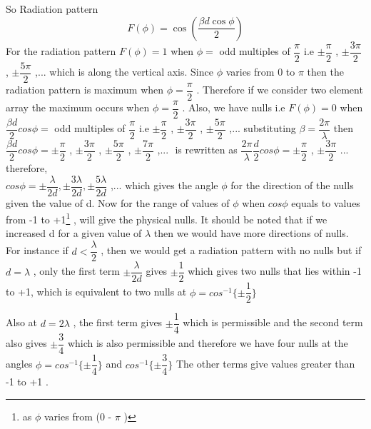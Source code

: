 So Radiation pattern
$$F(\phi) = \cos\left(\frac{\beta d\cos\phi}{2}\right)$$
For the radiation pattern $ F(\phi) = 1 $ when $\phi = $ odd multiples of $ \dfrac{\pi}{2} $ i.e $ \pm \dfrac{\pi}{2} $ , $ \pm \dfrac{3\pi}{2} $ , $ \pm \dfrac{5\pi}{2} $ ,... which is along the vertical axis. Since $ \phi $ varies from 0 to $ \pi $ then the radiation pattern is maximum when $ \phi = \dfrac{\pi}{2} $ . Therefore if we consider two element array the maximum occurs when $ \phi = \dfrac{\pi}{2} $ . Also, we have nulls i.e $ F(\phi) = 0 $ when $ \dfrac{\beta d}{2} cos\phi = $ odd multiples of $ \dfrac{\pi}{2} $  i.e  $ \pm \dfrac{\pi}{2} $ , $ \pm \dfrac{3\pi}{2} $ , $ \pm \dfrac{5\pi}{2} $ ,... substituting $ \beta = \dfrac{2\pi}{\lambda} $ then $ \dfrac{\beta d}{2} cos\phi = \pm \dfrac{\pi}{2} $ , $ \pm \dfrac{3\pi}{2} $ , $ \pm \dfrac{5\pi}{2} $ , $ \pm \dfrac{7\pi}{2} $ ,... $ $ is rewritten as $ \dfrac{2\pi}{\lambda} \dfrac{d}{2} cos \phi = \pm \dfrac{\pi}{2} $ , $ \pm \dfrac{3\pi}{2} $ ... therefore,
\\ $ cos \phi = \pm \dfrac{\lambda}{2d} , \pm \dfrac{3\lambda}{2d} , \pm \dfrac{5\lambda}{2d} $ ,... which gives the angle $ \phi $ for the direction of the nulls given the value of d. Now for the range of values of $ \phi $ when $ cos\phi $ equals to values from -1 to +1\footnote{as $ \phi $ varies from (0 - $ \pi $ )} , will give the physical nulls. It should be noted that if we increased d for a given value of $ \lambda $ then we would have more directions of nulls. For instance if $ d < \dfrac{\lambda}{2} $ , then we would get a radiation pattern with no nulls but if $ d = \lambda $ , only the first term $ \pm \dfrac{\lambda}{2d} $ gives $ \pm \dfrac{1}{2} $ which gives two nulls that lies within -1 to +1, which is equivalent to two nulls  at $ \phi = cos^{-1} \{\pm \dfrac{1}{2} \}  $  

Also at $ d = 2 \lambda $ , the first term gives $ \pm \dfrac{1}{4} $ which is permissible and the second term also gives  $ \pm \dfrac{3}{4} $ which is also permissible  and therefore we have four nulls at the angles $ \phi = cos^{-1} \{\pm \dfrac{1}{4} \}  $ and $ cos^{-1} \{\pm \dfrac{3}{4} \}  $ 
The other terms give values greater than -1 to +1 .

